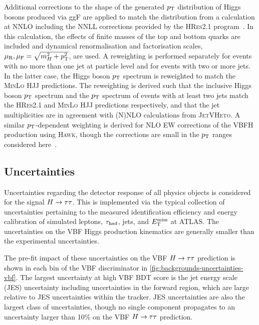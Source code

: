 Additional corrections to the shape of the generated $p_{\mathrm{T}}$ distribution of Higgs bosons produced via ggF are applied to match the distribution from a calculation at NNLO including the NNLL corrections provided by the \textsc{HRes2.1} program~\cite{HIGG-2013-32}. In this calculation, the effects of finite masses of the top and bottom quarks are included and dynamical renormalisation and factorisation scales, $\mu_\mathrm{R},\mu_\mathrm{F} = \sqrt{m_{H}^2 + p_{\mathrm{T}}^2}$, are used.  A reweighting is performed separately for events with no more than one jet at particle level and for events with two or more jets. In the latter case, the Higgs boson $p_{\mathrm{T}}$ spectrum is reweighted to match the \textsc{MinLo HJJ} predictions. The reweighting is derived such that the inclusive Higgs boson $p_{\mathrm{T}}$ spectrum and the $p_{\mathrm{T}}$ spectrum of events with at least two jets match the \textsc{HRes2.1} and \textsc{MinLo HJJ} predictions respectively, and that the jet multiplicities are in agreement with (N)NLO calculations from \textsc{JetVHeto}. A similar $p_{\mathrm{T}}$-dependent weighting is derived for NLO EW corrections of the VBFH production using \textsc{Hawk}, though the corrections are small in the $p_{\mathrm{T}}$ ranges considered here~\cite{HIGG-2013-32}.

\subsection{Uncertainties}

Uncertainties regarding the detector response of all physics objects is considered for the signal $H\rightarrow\tau\tau$. This is implemented via the typical collection of uncertainties pertaining to the measured identification efficiency and energy calibration of simulated leptons, $\tau_\text{had}$, jets, and $E_{\mathrm{T}}^{\mathrm{miss}}$ at ATLAS. The uncertainties on the VBF Higgs production kinematics are generally smaller than the experimental uncertainties.

The pre-fit impact of these uncertainties on the VBF $H\rightarrow\tau\tau$ prediction is shown in each bin of the VBF discriminator in \cref{fig:backgrounds-uncertainties-vbf}. The largest uncertainty at high VBF BDT score is the jet energy scale (JES) uncertainty including uncertainties in the forward region, which are large relative to JES uncertainties within the tracker. JES uncertainties are also the largest class of uncertainties, though no single component propagates to an uncertainty larger than 10\% on the VBF $H\rightarrow\tau\tau$ prediction.

